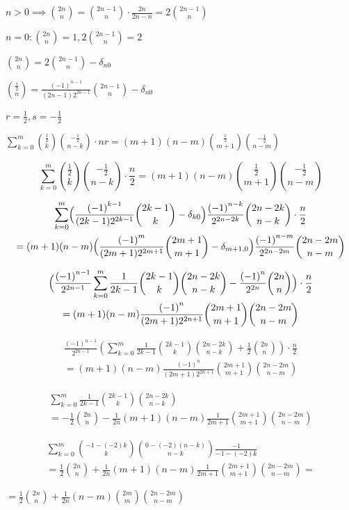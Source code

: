 \documentclass{article}
\begin{document}
\( n > 0 \implies \binom{2n}{n} = \binom{2n-1}{n}\cdot\frac{2n}{2n-n} = 2 \binom{2n-1}{n} \)

\( n = 0: \binom{2n}{n} = 1, 2 \binom{2n-1}{n} = 2 \)

\( \binom{2n}{n} = 2 \binom{2n-1}{n} - \delta_{n0} \)

\( \binom{\frac{1}{2}}{n} = \frac{{(-1)}^{n-1}}{(2n-1) 2^{2n-1}} \binom{2n-1}{n} - \delta_{n0} \)

\( r = \frac{1}{2}, s = -\frac{1}{2} \)

\( \sum_{k=0}^{m} \binom{\frac{1}{2}}{k}\binom{-\frac{1}{2}}{n-k} \cdot nr = (m+1)(n-m) \binom{\frac{1}{2}}{m+1}\binom{-\frac{1}{2}}{n-m} \)

\[ \sum_{k=0}^{m} \binom{\frac{1}{2}}{k}\binom{-\frac{1}{2}}{n-k} \cdot \frac{n}{2} = (m+1)(n-m) \binom{\frac{1}{2}}{m+1}\binom{-\frac{1}{2}}{n-m} \]

\begin{multline*}
\sum_{k=0}^{m} \Bigl(\frac{{(-1)}^{k-1}}{(2k-1) 2^{2k-1}} \binom{2k-1}{k} - \delta_{k0}\Bigr) \frac{{(-1)}^{n-k}}{2^{2n-2k}} \binom{2n-2k}{n-k} \cdot \frac{n}{2} \\
= (m+1)(n-m) \Bigl(\frac{{(-1)}^{m}}{(2m+1) 2^{2m+1}} \binom{2m+1}{m+1} - \delta_{m+1,0}\Bigr) \frac{{(-1)}^{n-m}}{2^{2n-2m}} \binom{2n-2m}{n-m}
\end{multline*}

\begin{multline*}
\Bigl(\frac{{(-1)}^{n-1}}{2^{2n-1}}\sum_{k=0}^{m} \frac{1}{2k-1} \binom{2k-1}{k} \binom{2n-2k}{n-k} - \frac{{(-1)}^{n}}{2^{2n}} \binom{2n}{n}\Bigr) \cdot \frac{n}{2} \\
= (m+1)(n-m) \frac{{(-1)}^{n}}{(2m+1) 2^{2n+1}} \binom{2m+1}{m+1} \binom{2n-2m}{n-m}
\end{multline*}

\begin{multline*}
\frac{{(-1)}^{n-1}}{2^{2n-1}} (\sum_{k=0}^{m} \frac{1}{2k-1} \binom{2k-1}{k} \binom{2n-2k}{n-k} + \frac{1}{2} \binom{2n}{n}) \cdot \frac{n}{2} \\
= (m+1)(n-m) \frac{{(-1)}^{n}}{(2m+1) 2^{2n+1}} \binom{2m+1}{m+1} \binom{2n-2m}{n-m}
\end{multline*}

\begin{multline*}
\sum_{k=0}^{m} \frac{1}{2k-1} \binom{2k-1}{k} \binom{2n-2k}{n-k} \\
= - \frac{1}{2} \binom{2n}{n} - \frac{1}{2n} (m+1)(n-m) \frac{1}{2m+1} \binom{2m+1}{m+1} \binom{2n-2m}{n-m}
\end{multline*}

\begin{multline*}
\sum_{k=0}^{m} \binom{-1-(-2)k}{k} \binom{0 - (-2)(n-k)}{n-k} \frac{-1}{-1-(-2)k} \\
= \frac{1}{2} \binom{2n}{n} + \frac{1}{2n} (m+1)(n-m) \frac{1}{2m+1} \binom{2m+1}{m+1} \binom{2n-2m}{n-m} =
\end{multline*}

\( =  \frac{1}{2} \binom{2n}{n} + \frac{1}{2n} (n-m) \binom{2m}{m} \binom{2n-2m}{n-m} \)
\end{document}
